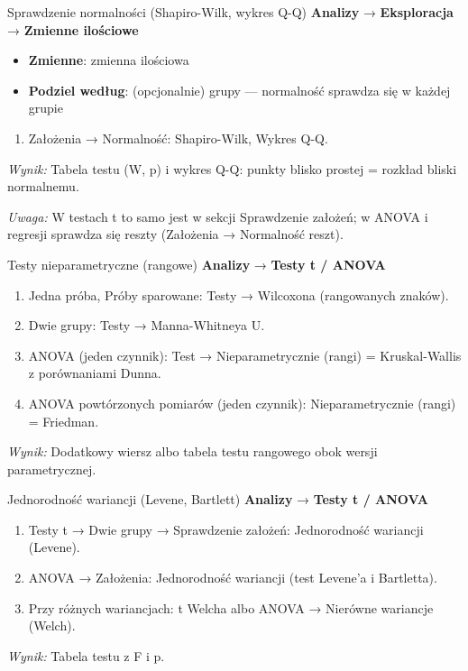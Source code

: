 \documentclass[
  polish,
  10pt,
  a4paper,
  DIV=11,
  numbers=noendperiod]{scrartcl}
\newcommand{\jmenu}[1]{{\color{upwraccent}\small #1}}
\begin{document}
\begin{jbox}{Sprawdzenie normalności (Shapiro-Wilk, wykres Q-Q)}\label{w:normalnosc}
\jmenu{\textbf{Analizy} → \textbf{Eksploracja} → \textbf{Zmienne ilościowe}}

\begin{itemize}
\item[$\triangleright$] \textbf{Zmienne}: zmienna ilościowa
\item[$\triangleright$] \textbf{Podziel według}: (opcjonalnie) grupy — normalność sprawdza się w każdej grupie
\end{itemize}
\begin{enumerate}
\item Założenia → Normalność: Shapiro-Wilk, Wykres Q-Q.
\end{enumerate}
\textit{Wynik:} Tabela testu (W, p) i wykres Q-Q: punkty blisko prostej = rozkład bliski normalnemu.

{\color{upwrsoft}\small\textit{Uwaga:} W testach t to samo jest w sekcji Sprawdzenie założeń; w ANOVA i regresji sprawdza się reszty (Założenia → Normalność reszt).}
\end{jbox}

\begin{jbox}{Testy nieparametryczne (rangowe)}\label{w:nieparametryczne}
\jmenu{\textbf{Analizy} → \textbf{Testy t / ANOVA}}

\begin{enumerate}
\item Jedna próba, Próby sparowane: Testy → Wilcoxona (rangowanych znaków).
\item Dwie grupy: Testy → Manna-Whitneya U.
\item ANOVA (jeden czynnik): Test → Nieparametrycznie (rangi) = Kruskal-Wallis z porównaniami Dunna.
\item ANOVA powtórzonych pomiarów (jeden czynnik): Nieparametrycznie (rangi) = Friedman.
\end{enumerate}
\textit{Wynik:} Dodatkowy wiersz albo tabela testu rangowego obok wersji parametrycznej.

\end{jbox}

\begin{jbox}{Jednorodność wariancji (Levene, Bartlett)}\label{w:wariancje}
\jmenu{\textbf{Analizy} → \textbf{Testy t / ANOVA}}

\begin{enumerate}
\item Testy t → Dwie grupy → Sprawdzenie założeń: Jednorodność wariancji (Levene).
\item ANOVA → Założenia: Jednorodność wariancji (test Levene’a i Bartletta).
\item Przy różnych wariancjach: t Welcha albo ANOVA → Nierówne wariancje (Welch).
\end{enumerate}
\textit{Wynik:} Tabela testu z F i p.

\end{jbox}
\end{document}
